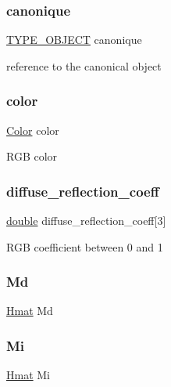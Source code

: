 \subsubsection{\texorpdfstring{canonique}{canonique}}
{\footnotesize\ttfamily \hyperlink{_object_8h_af3ec464aa442c2d0bd0c227fda28a8be}{T\+Y\+P\+E\+\_\+\+O\+B\+J\+E\+CT} canonique}

reference to the canonical object \mbox{\label{struct_object_aa5f4d1eda21c196bd8401ff73f105073}} 
\subsubsection{\texorpdfstring{color}{color}}
{\footnotesize\ttfamily \hyperlink{struct_color}{Color} color}

R\+GB color \mbox{\label{struct_object_a365382686d7b8904ca564cd7745a7dbe}} 
\subsubsection{\texorpdfstring{diffuse\+\_\+reflection\+\_\+coeff}{diffuse\_reflection\_coeff}}
{\footnotesize\ttfamily \hyperlink{g3x__transfo_8h_a89b2b23e407882a535d835574a7912e1}{double} diffuse\+\_\+reflection\+\_\+coeff\mbox{[}3\mbox{]}}

R\+GB coefficient between 0 and 1 \mbox{\label{struct_object_a2e39a1b3b70d4fad8a907b217ef63f59}} 
\subsubsection{\texorpdfstring{Md}{Md}}
{\footnotesize\ttfamily \hyperlink{_hmat_8h_a7263a9d077d77f58425e01446b766c9f}{Hmat} Md}

\mbox{\label{struct_object_ab0efdf841b049d1b6f42f1c6c28a9557}} 
\subsubsection{\texorpdfstring{Mi}{Mi}}
{\footnotesize\ttfamily \hyperlink{_hmat_8h_a7263a9d077d77f58425e01446b766c9f}{Hmat} Mi}

